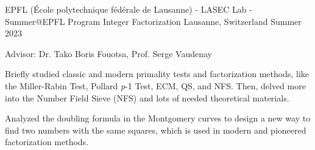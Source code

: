 \begin{cventries}
  \cventry
  {EPFL (École polytechnique fédérale de Lausanne) - LASEC Lab - Summer@EPFL Program}
  {Integer Factorization}
  {Lausanne, Switzerland}
  {Summer 2023}
  {
    \begin{cvitems}
      \item Advisor: Dr. Tako Boris Fouotsa, Prof. Serge Vaudenay
      \hfill
      \item
      Briefly studied classic and modern primality tests and factorization methods, like the Miller-Rabin Test, Pollard \textit{p}-1 Test, ECM, QS, and NFS. Then, delved more into the Number Field Sieve (NFS) and lots of needed theoretical materials.
      \item Analyzed the doubling formula in the Montgomery curves to design a new way to find two numbers with the same squares, which is used in modern and pioneered factorization methods.
    \end{cvitems}
  }
\end{cventries}
